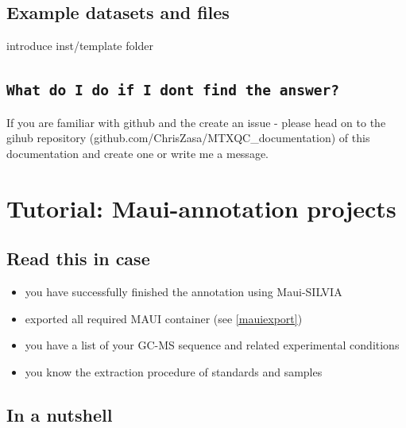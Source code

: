 \documentclass[]{book}
\providecommand{\tightlist}{%
  \setlength{\itemsep}{0pt}\setlength{\parskip}{0pt}}
\theoremstyle{definition}
\theoremstyle{definition}
\theoremstyle{definition}
\theoremstyle{remark}
\begin{document}
\section{Example datasets and files}\label{example-datasets-and-files}

introduce inst/template folder

\section{\texorpdfstring{\texttt{What\ do\ I\ do\ if\ I\ don\textquotesingle{}t\ find\ the\ answer?}}{What do I do if I don't find the answer?}}\label{what-do-i-do-if-i-dont-find-the-answer}

If you are familiar with github and the create an issue - please head on
to the gihub repository (github.com/ChrisZasa/MTXQC\_documentation) of
this documentation and create one or write me a message.

\chapter{Tutorial: Maui-annotation projects}\label{maui}

\section{Read this in case}\label{read-this-in-case}

\begin{itemize}
\tightlist
\item
  you have successfully finished the annotation using Maui-SILVIA
\item
  exported all required MAUI container (see \ref{mauiexport})
\item
  you have a list of your GC-MS sequence and related experimental
  conditions
\item
  you know the extraction procedure of standards and samples
\end{itemize}

\section{In a nutshell}\label{nutshellmaui}
\end{document}

